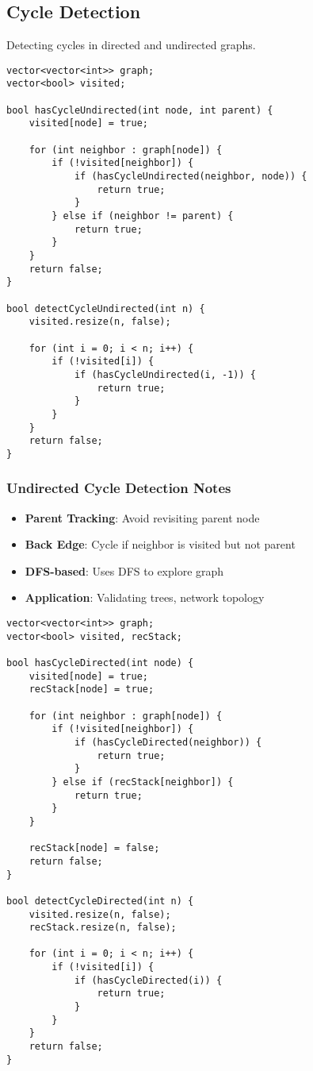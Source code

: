 \documentclass[11pt,a4paper]{article}
\begin{document}
\newpage
\subsection{Cycle Detection}
Detecting cycles in directed and undirected graphs.

\begin{lstlisting}[caption={Cycle Detection in Undirected Graph}]
vector<vector<int>> graph;
vector<bool> visited;

bool hasCycleUndirected(int node, int parent) {
    visited[node] = true;
    
    for (int neighbor : graph[node]) {
        if (!visited[neighbor]) {
            if (hasCycleUndirected(neighbor, node)) {
                return true;
            }
        } else if (neighbor != parent) {
            return true;
        }
    }
    return false;
}

bool detectCycleUndirected(int n) {
    visited.resize(n, false);
    
    for (int i = 0; i < n; i++) {
        if (!visited[i]) {
            if (hasCycleUndirected(i, -1)) {
                return true;
            }
        }
    }
    return false;
}
\end{lstlisting}

\subsubsection*{Undirected Cycle Detection Notes}
\begin{itemize}
\item \textbf{Parent Tracking}: Avoid revisiting parent node
\item \textbf{Back Edge}: Cycle if neighbor is visited but not parent
\item \textbf{DFS-based}: Uses DFS to explore graph
\item \textbf{Application}: Validating trees, network topology
\end{itemize}

\newpage
\begin{lstlisting}[caption={Cycle Detection in Directed Graph}]
vector<vector<int>> graph;
vector<bool> visited, recStack;

bool hasCycleDirected(int node) {
    visited[node] = true;
    recStack[node] = true;
    
    for (int neighbor : graph[node]) {
        if (!visited[neighbor]) {
            if (hasCycleDirected(neighbor)) {
                return true;
            }
        } else if (recStack[neighbor]) {
            return true;
        }
    }
    
    recStack[node] = false;
    return false;
}

bool detectCycleDirected(int n) {
    visited.resize(n, false);
    recStack.resize(n, false);
    
    for (int i = 0; i < n; i++) {
        if (!visited[i]) {
            if (hasCycleDirected(i)) {
                return true;
            }
        }
    }
    return false;
}
\end{lstlisting}
\end{document}
